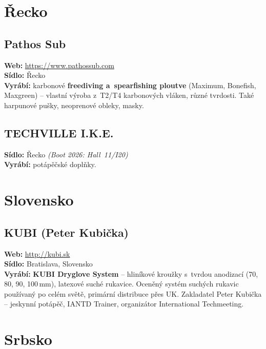 \documentclass[11pt,a4paper]{article}
\begin{document}
\section{Řecko}

\subsection{Pathos Sub}
\textbf{Web:} \url{https://www.pathossub.com} \\
\textbf{Sídlo:} Řecko \\
\textbf{Vyrábí:} karbonové \textbf{freediving a~spearfishing ploutve} (Maximum, Bonefish, Maxgreen) -- vlastní výroba z~T2/T4 karbonových vláken, různé tvrdosti. Také harpunové pušky, neoprenové obleky, masky.

\subsection{TECHVILLE I.K.E.}
\textbf{Sídlo:} Řecko \quad\emph{(Boot 2026: Hall~11/I20)} \\
\textbf{Vyrábí:} potápěčské doplňky.

\section{Slovensko}

\subsection{KUBI (Peter Kubička)}
\textbf{Web:} \url{http://kubi.sk} \\
\textbf{Sídlo:} Bratislava, Slovensko \\
\textbf{Vyrábí:} \textbf{KUBI Dryglove System} -- hliníkové kroužky s~tvrdou anodizací (70, 80, 90, 100\,mm), latexové suché rukavice. Oceněný systém suchých rukavic používaný po celém světě, primární distribuce přes UK. Zakladatel Peter Kubička -- jeskynní potápěč, IANTD Trainer, organizátor International Techmeeting.

\section{Srbsko}
\end{document}
